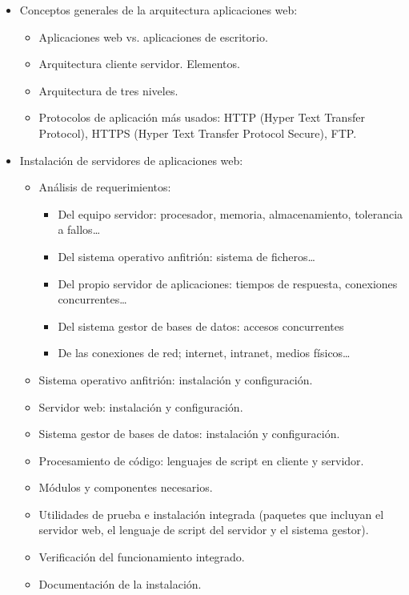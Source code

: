 \documentclass[a4paper]{article}
\begin{document}
\begin{itemize}
\item Conceptos generales de la arquitectura aplicaciones web:
\begin{itemize}
\item Aplicaciones web vs. aplicaciones de escritorio.
\item Arquitectura cliente servidor. Elementos.
\item Arquitectura de tres niveles.
\item Protocolos de aplicación más usados: HTTP (Hyper Text Transfer Protocol), HTTPS (Hyper Text Transfer Protocol Secure), FTP.
\end{itemize}
\end{itemize}
\begin{itemize}
\item Instalación de servidores de aplicaciones web:
\begin{itemize}
\item Análisis de requerimientos:
\begin{itemize}
\item Del equipo servidor: procesador, memoria, almacenamiento, tolerancia a fallos\ldots{}
\item Del sistema operativo anfitrión: sistema de ficheros\ldots{}
\item Del propio servidor de aplicaciones: tiempos de respuesta, conexiones concurrentes\ldots{}
\item Del sistema gestor de bases de datos: accesos concurrentes
\item De las conexiones de red; internet, intranet, medios físicos\ldots{}
\end{itemize}
\item Sistema operativo anfitrión: instalación y configuración.
\item Servidor web: instalación y configuración.
\item Sistema gestor de bases de datos: instalación y configuración.
\item Procesamiento de código: lenguajes de script en cliente y servidor.
\item Módulos y componentes necesarios.
\item Utilidades de prueba e instalación integrada (paquetes que incluyan el servidor web, el lenguaje de script del servidor y el sistema gestor).
\item Verificación del funcionamiento integrado.
\item Documentación de la instalación.
\end{itemize}
\end{itemize}
\end{document}
